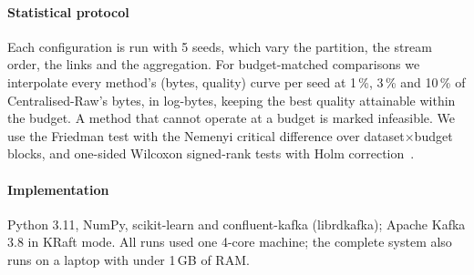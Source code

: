 \paragraph{Statistical protocol} Each configuration is run with 5 seeds, which vary the partition, the stream order, the links and the aggregation. For budget-matched comparisons we interpolate every method's (bytes, quality) curve per seed at 1\,\%, 3\,\% and 10\,\% of Centralised-Raw's bytes, in log-bytes, keeping the best quality attainable within the budget. A method that cannot operate at a budget is marked infeasible. We use the Friedman test with the Nemenyi critical difference over dataset$\times$budget blocks, and one-sided Wilcoxon signed-rank tests with Holm correction~\cite{demsar2006statistical}.

\paragraph{Implementation} Python 3.11, NumPy, scikit-learn and confluent-kafka (librdkafka); Apache Kafka 3.8 in KRaft mode. All runs used one 4-core machine; the complete system also runs on a laptop with under 1\,GB of RAM.
